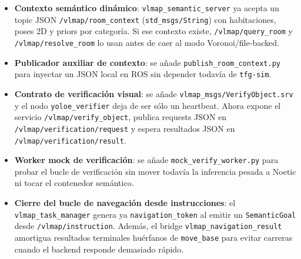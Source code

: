 \documentclass[11pt,a4paper]{article}
\begin{document}
\begin{itemize}
  \item \textbf{Contexto semántico dinámico}: \texttt{vlmap\_semantic\_server}
        ya acepta un topic JSON \texttt{/vlmap/room\_context}
        (\texttt{std\_msgs/String}) con habitaciones, poses 2D y priors por
        categoría. Si ese contexto existe, \texttt{/vlmap/query\_room} y
        \texttt{/vlmap/resolve\_room} lo usan antes de caer al modo
        Voronoi/file-backed.
  \item \textbf{Publicador auxiliar de contexto}: se añade
        \texttt{publish\_room\_context.py} para inyectar un JSON local en ROS
        sin depender todavía de \texttt{tfg-sim}.
  \item \textbf{Contrato de verificación visual}: se añade
        \texttt{vlmap\_msgs/VerifyObject.srv} y el nodo
        \texttt{yoloe\_verifier} deja de ser sólo un heartbeat. Ahora expone el
        servicio \texttt{/vlmap/verify\_object}, publica requests JSON en
        \texttt{/vlmap/verification/request} y espera resultados JSON en
        \texttt{/vlmap/verification/result}.
  \item \textbf{Worker mock de verificación}: se añade
        \texttt{mock\_verify\_worker.py} para probar el bucle de verificación
        sin mover todavía la inferencia pesada a Noetic ni tocar el contenedor
        semántico.
  \item \textbf{Cierre del bucle de navegación desde instrucciones}: el
        \texttt{vlmap\_task\_manager} genera ya \texttt{navigation\_token} al
        emitir un \texttt{SemanticGoal} desde
        \texttt{/vlmap/instruction}. Además, el bridge
        \texttt{vlmap\_navigation\_result} amortigua resultados terminales
        huérfanos de \texttt{move\_base} para evitar carreras cuando el backend
        responde demasiado rápido.
\end{itemize}
\end{document}
